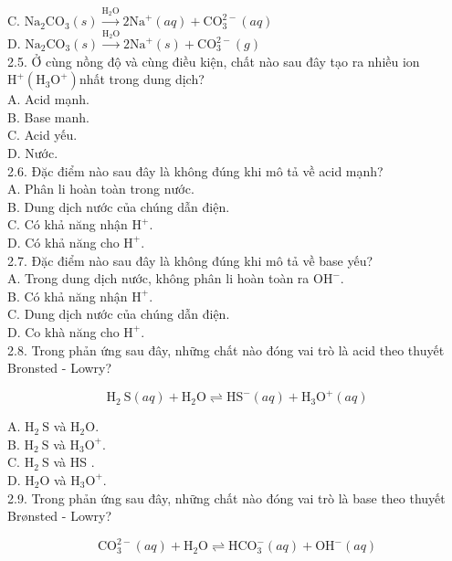 \documentclass[10pt]{article}
\begin{document}
C. $\mathrm{Na}_{2} \mathrm{CO}_{3}(s) \xrightarrow{\mathrm{H}_{2} \mathrm{O}} 2 \mathrm{Na}^{+}(a q)+\mathrm{CO}_{3}^{2-}(a q)$\\
D. $\mathrm{Na}_{2} \mathrm{CO}_{3}(s) \xrightarrow{\mathrm{H}_{2} \mathrm{O}} 2 \mathrm{Na}^{+}(s)+\mathrm{CO}_{3}^{2-}(g)$\\
2.5. Ở cùng nồng độ và cùng điều kiện, chất nào sau đây tạo ra nhiều ion $\mathrm{H}^{+} \left(\mathrm{H}_{3} \mathrm{O}^{+}\right)$nhất trong dung dịch?\\
A. Acid mạnh.\\
B. Base manh.\\
C. Acid yếu.\\
D. Nước.\\
2.6. Đặc điểm nào sau đây là không đúng khi mô tả về acid mạnh?\\
A. Phân li hoàn toàn trong nước.\\
B. Dung dịch nước của chúng dẫn điện.\\
C. Có khả năng nhận $\mathrm{H}^{+}$.\\
D. Có khả năng cho $\mathrm{H}^{+}$.\\
2.7. Đặc điểm nào sau đây là không đúng khi mô tả về base yếu?\\
A. Trong dung dịch nước, không phân li hoàn toàn ra $\mathrm{OH}^{-}$.\\
B. Có khả năng nhận $\mathrm{H}^{+}$.\\
C. Dung dịch nước của chúng dẫn điện.\\
D. Co khà năng cho $\mathrm{H}^{+}$.\\
2.8. Trong phản ứng sau đây, những chất nào đóng vai trò là acid theo thuyết Bronsted - Lowry?

$$
\mathrm{H}_{2} \mathrm{~S}(a q)+\mathrm{H}_{2} \mathrm{O} \rightleftharpoons \mathrm{HS}^{-}(a q)+\mathrm{H}_{3} \mathrm{O}^{+}(a q)
$$

A. $\mathrm{H}_{2} \mathrm{~S}$ và $\mathrm{H}_{2} \mathrm{O}$.\\
B. $\mathrm{H}_{2} \mathrm{~S}$ và $\mathrm{H}_{3} \mathrm{O}^{+}$.\\
C. $\mathrm{H}_{2} \mathrm{~S}$ và HS .\\
D. $\mathrm{H}_{2} \mathrm{O}$ và $\mathrm{H}_{3} \mathrm{O}^{+}$.\\
2.9. Trong phản ứng sau đây, những chất nào đóng vai trò là base theo thuyết Brønsted - Lowry?

$$
\mathrm{CO}_{3}^{2-}(a q)+\mathrm{H}_{2} \mathrm{O} \rightleftharpoons \mathrm{HCO}_{3}^{-}(a q)+\mathrm{OH}^{-}(a q)
$$
\end{document}
